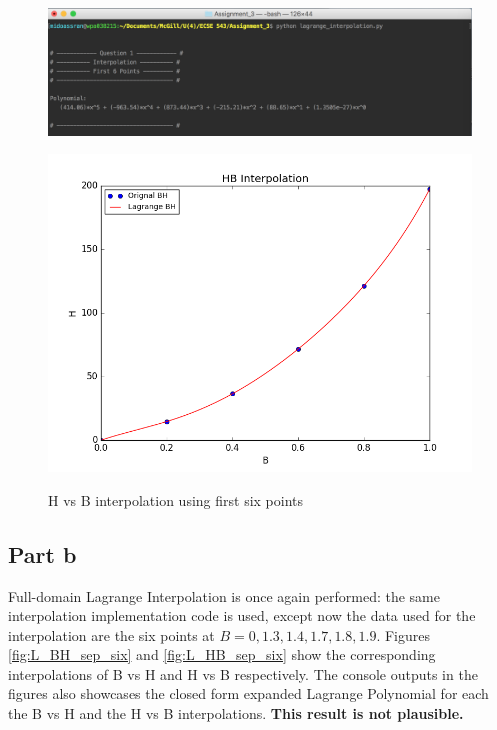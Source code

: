 \documentclass[11pt]{article}
\begin{document}
\begin{figure}[!hbp]
	\begin{center}
		\begin{minipage}{ \textwidth}
			\includegraphics[width= \textwidth]{o_L_HB_first_six.png}\\
		\end{minipage}
		\begin{minipage}{ \textwidth}
			\includegraphics[width=\textwidth]{L_HB_first_six.png}\\
		\end{minipage}
		\caption{\label{fig:L_HB_first_six}H vs B interpolation using first six points}
	\end{center}
\end{figure}

\FloatBarrier
\subsection*{Part b}
Full-domain Lagrange Interpolation is once again performed: the same interpolation implementation code is used, except now the data used for the interpolation are the six points at $B = 0, 1.3, 1.4, 1.7, 1.8, 1.9$.  Figures \ref{fig:L_BH_sep_six} and \ref{fig:L_HB_sep_six} show the corresponding interpolations of B vs H and H vs B respectively. The console outputs in the figures also showcases the closed form expanded Lagrange Polynomial for each the B vs H and the H vs B interpolations. \textbf{This result is not plausible.}
\end{document}
